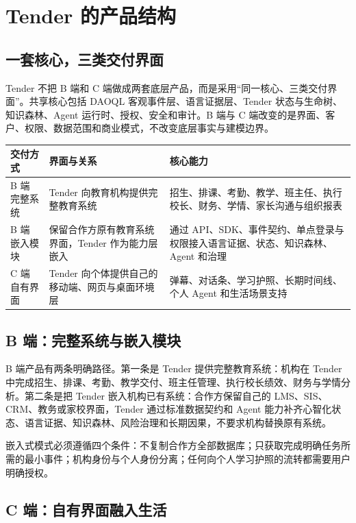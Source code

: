 \documentclass[UTF8,a4paper,11pt]{ctexart}
\begin{document}
\section{Tender 的产品结构}

\subsection{一套核心，三类交付界面}

Tender 不把 B 端和 C 端做成两套底层产品，而是采用“同一核心、三类交付界面”。共享核心包括 DAOQL 客观事件层、语言证据层、Tender 状态与生命树、知识森林、Agent 运行时、授权、安全和审计。B 端与 C 端改变的是界面、客户、权限、数据范围和商业模式，不改变底层事实与建模边界。

\begin{center}
\begin{longtable}{@{}p{3.0cm}p{4.6cm}p{5.2cm}@{}}
\toprule
\textbf{交付方式} & \textbf{界面与关系} & \textbf{核心能力} \\
\midrule
B 端完整系统 & Tender 向教育机构提供完整教育系统 & 招生、排课、考勤、教学、班主任、执行校长、财务、学情、家长沟通与组织报表 \\
B 端嵌入模块 & 保留合作方原有教育系统界面，Tender 作为能力层嵌入 & 通过 API、SDK、事件契约、单点登录与权限接入语言证据、状态、知识森林、Agent 和治理 \\
C 端自有界面 & Tender 向个体提供自己的移动端、网页与桌面环境层 & 弹幕、对话条、学习护照、长期时间线、个人 Agent 和生活场景支持 \\
\bottomrule
\end{longtable}
\end{center}

\subsection{B 端：完整系统与嵌入模块}

B 端产品有两条明确路径。第一条是 Tender 提供完整教育系统：机构在 Tender 中完成招生、排课、考勤、教学交付、班主任管理、执行校长绩效、财务与学情分析。第二条是把 Tender 嵌入机构已有系统：合作方保留自己的 LMS、SIS、CRM、教务或家校界面，Tender 通过标准数据契约和 Agent 能力补齐心智化状态、语言证据、知识森林、风险治理和长期因果，不要求机构替换原有系统。

嵌入式模式必须遵循四个条件：不复制合作方全部数据库；只获取完成明确任务所需的最小事件；机构身份与个人身份分离；任何向个人学习护照的流转都需要用户明确授权。

\subsection{C 端：自有界面融入生活}
\end{document}

